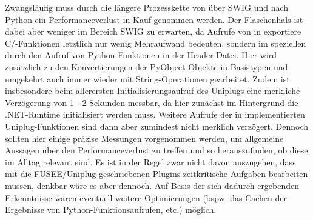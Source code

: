 Zwangsläufig muss durch die längere Prozesskette von \CS{} über SWIG und \CC nach Python ein Performanceverlust in Kauf genommen werden. Der Flaschenhals ist dabei aber weniger im Bereich SWIG zu erwarten, da Aufrufe von \CS{} in exportiere C/\CC-Funktionen letztlich nur wenig Mehraufwand bedeuten, sondern im speziellen durch den Aufruf von Python-Funktionen in der Header-Datei. Hier wird zusätzlich zu den Konvertierungen der PyObject-Objekte in Basistypen und umgekehrt auch immer wieder mit String-Operationen gearbeitet. Zudem ist insbesondere beim allerersten Initialisierungsaufruf des Uniplugs eine merkliche Verzögerung von 1 - 2 Sekunden messbar, da hier zunächst im Hintergrund die .NET-Runtime initialisiert werden muss. Weitere Aufrufe der in \CS{} implementierten Uniplug-Funktionen sind dann aber zumindest nicht merklich verzögert. Dennoch sollten hier einige präzise Messungen vorgenommen werden, um allgemeine Aussagen über den Performanceverlust zu treffen und so herauszufinden, ob diese im Alltag relevant sind. Es ist in der Regel zwar nicht davon auszugehen, dass mit die FUSEE/Uniplug geschriebenen Plugins zeitkritische Aufgaben bearbeiten müssen, denkbar wäre es aber dennoch. Auf Basis der sich dadurch ergebenden Erkenntnisse wären eventuell weitere Optimierungen (bspw. das Cachen der Ergebnisse von Python-Funktionsaufrufen, etc.) möglich.